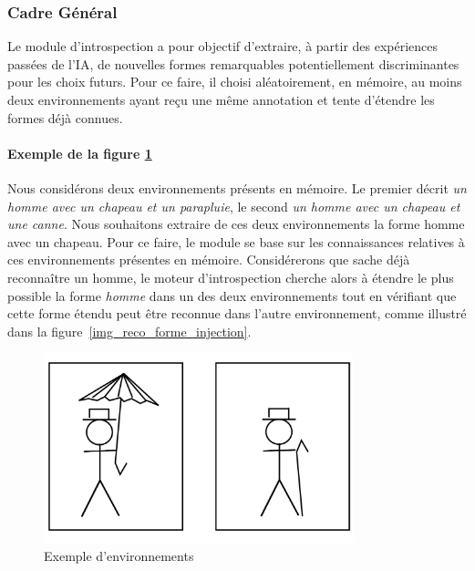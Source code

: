 \label{subsection_introspection}
\subsubsection{Cadre Général}

Le module d'introspection a pour objectif d'extraire, à partir des expériences passées de l'IA, de nouvelles formes remarquables potentiellement discriminantes pour les choix futurs. Pour ce faire, il choisi aléatoirement, en mémoire, au moins deux environnements ayant reçu une même annotation et tente d'étendre les formes déjà connues.

\paragraph{Exemple de la figure \ref{img_reco_forme_0}}
Nous considérons deux environnements présents en mémoire. Le premier décrit \emph{un homme avec un chapeau et un parapluie}, le second \emph{un homme avec un chapeau et une canne}. Nous souhaitons extraire de ces deux environnements la forme homme avec un chapeau. Pour ce faire, le module se base sur les connaissances relatives à ces environnements présentes en mémoire. Considérerons que \cogito{} sache déjà reconnaître un homme, le moteur d'introspection cherche alors à étendre le plus possible la forme \emph{homme} dans un des deux environnements tout en vérifiant que cette forme étendu peut être reconnue dans l'autre environnement, comme illustré dans la figure~\ref{img_reco_forme_injection}.

\begin{figure}[H] 
\begin{center}
\includegraphics[width=0.8\textwidth]{files/raisonneur/reconnaissance_de_formes_0} 
\end{center}
\caption{Exemple d'environnements}
\label{img_reco_forme_0}
\end{figure}


